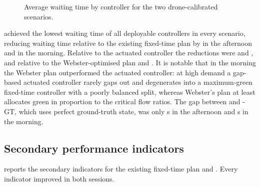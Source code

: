 \begin{figure}[H]
\centering
{}
\caption{Average waiting time by controller for the two drone-calibrated scenarios.}
\label{fig:wait-bars}
\end{figure}

\prism{} achieved the lowest waiting time of all deployable controllers in every scenario, reducing waiting time relative to the existing fixed-time plan by  in the afternoon and  in the morning. Relative to the \sumo{} actuated controller the reductions were  and , and relative to the Webster-optimised plan  and . It is notable that in the morning the Webster plan outperformed the actuated controller: at high demand a gap-based actuated controller rarely gaps out and degenerates into a maximum-green fixed-time controller with a poorly balanced split, whereas Webster's plan at least allocates green in proportion to the critical flow ratios. The gap between \prism{} and \prism{}-GT, which uses perfect ground-truth state, was only  s in the afternoon and  s in the morning.

\subsection{Secondary performance indicators}

 reports the secondary indicators for the existing fixed-time plan and \prism{}. Every indicator improved in both sessions.

